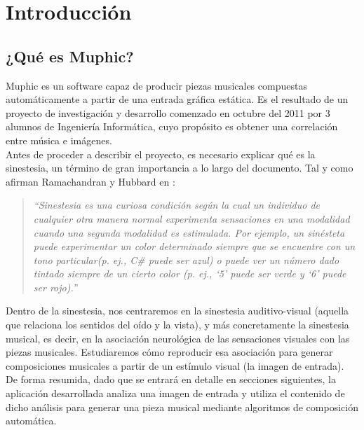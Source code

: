 \chapter{Introducción}


	\section{¿Qué es Muphic?}
	
		\vspace{0.2in}
		Muphic es un software capaz de producir piezas musicales compuestas automáticamente a partir de una entrada gráfica estática. Es el resultado de un proyecto de investigación y desarrollo comenzado en octubre del 2011 por 3 alumnos de Ingeniería Informática, cuyo propósito es obtener una correlación entre música e imágenes.\\
		
		Antes de proceder a describir el proyecto, es necesario explicar qué es la sinestesia, un término de gran importancia a lo largo del documento. Tal y como afirman Ramachandran y Hubbard en \cite[p.~4]{paperSyn}:
		
		\begin{quote}
		\emph{``Sinestesia es una curiosa condición según la cual un individuo de cualquier otra manera normal experimenta sensaciones en una modalidad cuando una segunda modalidad es estimulada. Por ejemplo, un sinésteta puede experimentar un color determinado siempre que se encuentre con un tono particular(p. ej., C\# puede ser azul) o puede ver un número dado tintado siempre de un cierto color (p. ej., ‘5’ puede ser verde y ‘6’ puede ser rojo).''}
		\end{quote}
		
		Dentro de la sinestesia, nos centraremos en la sinestesia auditivo-visual (aquella que relaciona los sentidos del oído y la vista), y más concretamente la sinestesia musical, es decir, en la asociación neurológica de las sensaciones visuales con las piezas musicales. Estudiaremos cómo reproducir esa asociación para generar composiciones musicales a partir de un estímulo visual (la imagen de entrada).\\
		 
		
		De forma resumida, dado que se entrará en detalle en secciones siguientes, la aplicación desarrollada analiza una imagen de entrada y utiliza el contenido de dicho análisis para generar una pieza musical mediante algoritmos de composición automática.\\
		
